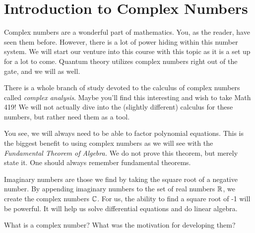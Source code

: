 
        \section{Introduction to Complex Numbers}

        Complex numbers are a wonderful part of mathematics.  You, as the reader, have seen them before.  However, there is a lot of power hiding within this number system.  We will start our venture into this course with this topic as it is a set up for a lot to come.  Quantum theory utilizes complex numbers right out of the gate, and we will as well.

        There is a whole branch of study devoted to the calculus of complex numbers called \emph{complex analysis}. Maybe you'll find this interesting and wish to take Math 419!  We will not actually dive into the (slightly different) calculus for these numbers, but rather need them as a tool.

        You see, we will always need to be able to factor polynomial equations. This is the biggest benefit to using complex numbers as we will see with the \emph{Fundamental Theorem of Algebra.} We do not prove this theorem, but merely state it. One should always remember fundamental theorems.

        Imaginary numbers are those we find by taking the square root of a negative number.  By appending imaginary numbers to the set of real numbers $\mathbb{R}$, we create the complex numbers $\mathbb{C}$. For us, the ability to find a square root of -1 will be powerful. It will help us solve differential equations and do linear algebra.

        \begin{question}
        What is a complex number? What was the motivation for developing them?
        \end{question}

